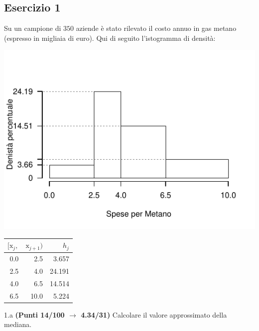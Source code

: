 \documentclass[
  11pt,
]{book}
\theoremstyle{mytheoremstyle}
\theoremstyle{mydefstyle}
\begin{document}
\subsection{Esercizio 1}\label{esercizio-1-7}

Su un campione di \(350\) aziende è stato rilevato il costo annuo in gas metano (espresso in migliaia di euro). Qui di seguito l'istogramma di densità:

\begin{center}\includegraphics{Esami_passati_con_soluzioni_files/figure-latex/2021-69-1} \end{center}

\begin{table}[H]
\centering
\begin{tabular}{rrr}
\toprule
$[\text{x}_j,$ & $\text{x}_{j+1})$ & $h_j$\\
\midrule
0.0 & 2.5 & 3.657\\
2.5 & 4.0 & 24.191\\
4.0 & 6.5 & 14.514\\
6.5 & 10.0 & 5.224\\
\bottomrule
\end{tabular}
\end{table}

1.a \textbf{(Punti 14/100 \(\rightarrow\) 4.34/31)} Calcolare il valore approssimato della mediana.
\end{document}
